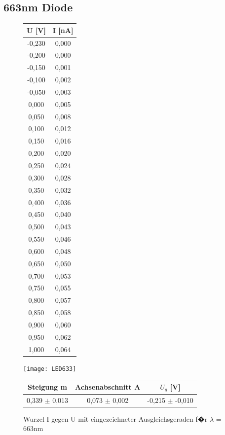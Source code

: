 \documentclass[a4paper, 10pt]{report}%
\begin{document}
\subsection{663nm Diode}
\begin{figure}[!htbp]
\begin{minipage}[t]{2cm}
\vspace{0pt}
\centering
\begin{center}
\begin{tabular}{c|c}
U [V] & I [nA] \\
\hline
-0,230&	0,000 \\
-0,200&	0,000 \\
-0,150&	0,001 \\
-0,100&	0,002 \\
-0,050&	0,003 \\
0,000&	0,005 \\
0,050&	0,008 \\
0,100&	0,012 \\
0,150&	0,016 \\
0,200&	0,020 \\
0,250&	0,024 \\
0,300&	0,028 \\
0,350&	0,032 \\
0,400&	0,036 \\
0,450&	0,040 \\
0,500&	0,043 \\
0,550&	0,046 \\
0,600&	0,048 \\
0,650&	0,050 \\
0,700&	0,053 \\
0,750&	0,055 \\
0,800&	0,057 \\
0,850&	0,058 \\
0,900&	0,060 \\
0,950&	0,062 \\
1,000&	0,064
\end{tabular}
\end{center}
\end{minipage}
\hfill
\begin{minipage}[t]{12cm}
\vspace{0pt}
\texttt{[image: LED633]}
\caption{Wurzel I gegen U mit eingezeichneter Ausgleichsgeraden f�r $\lambda$ = 663nm}
\begin{center}
\begin{tabular}{c|c|c}
Steigung m & Achsenabschnitt A & $U_g$ [V]\\
\hline
0,339 $\pm$ 0,013 & 0,073 $\pm$	0,002 & -0,215 $\pm$	-0,010
\end{tabular}
\end{center}
\end{minipage}
\end{figure}
\end{document}
